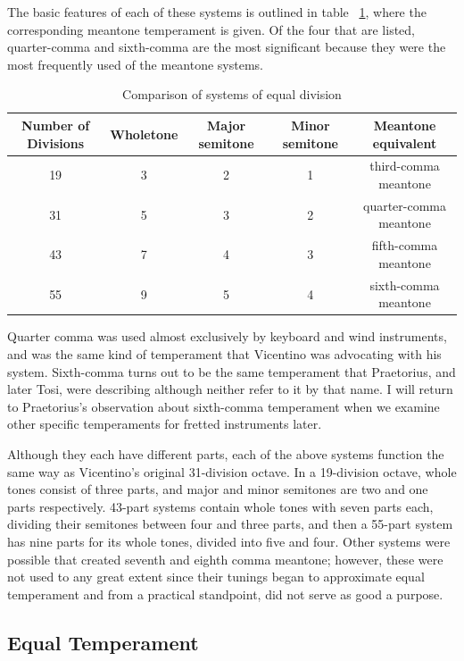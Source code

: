 The basic features of each of these systems is outlined in table
~\ref{table:equalDivision}, where the corresponding meantone temperament is given.  Of the
four that are listed, quarter-comma and sixth-comma are the most significant because they
were the most frequently used of the meantone systems.
\begin{table}[h!]
  \begin{center}
  \scalebox{0.7}
  {
    \begin{tabular}{ c c c c c}
      Number of Divisions & Wholetone & Major semitone & Minor semitone & Meantone equivalent \\
      \hline
      19 & 3 & 2 & 1 & third-comma meantone \\
      31 & 5 & 3 & 2 & quarter-comma meantone \\
      43 & 7 & 4 & 3 & fifth-comma meantone \\
      55 & 9 & 5 & 4 & sixth-comma meantone \\
    \end{tabular}
  }
  \end{center}
  \caption{Comparison of systems of equal division}
  \label{table:equalDivision}
\end{table}
Quarter comma was used almost exclusively by keyboard and wind instruments, and was the
same kind of temperament that Vicentino was advocating with his system. Sixth-comma turns
out to be the same temperament that Praetorius, and later Tosi, were describing although
neither refer to it by that name.  I will return to Praetorius's observation about
sixth-comma temperament when we examine other specific temperaments for fretted
instruments later.

Although they each have different parts, each of the above systems function the same way
as Vicentino's original 31-division octave. In a 19-division octave, whole tones consist
of three parts, and major and minor semitones are two and one parts respectively.  43-part
systems contain whole tones with seven parts each, dividing their semitones between four
and three parts, and then a 55-part system has nine parts for its whole tones, divided
into five and four.  Other systems were possible that created seventh and eighth comma
meantone; however, these were not used to any great extent since their tunings began to
approximate equal temperament and from a practical standpoint, did not serve as good a
purpose.

\subsection{Equal Temperament}

